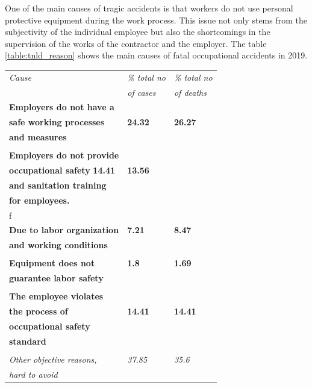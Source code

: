 \documentclass[conference]{IEEEtran}
\begin{document}
One of the main causes of tragic accidents is that workers do not use personal protective equipment during the work process. This issue not only stems from the subjectivity of the individual employee but also the shortcomings in the supervision of the works of the contractor and the employer. The table \ref{table:tnld_reason} shows the main causes of fatal occupational accidents in 2019.
\begin{center}

  \begin{tabular} {l l l}
  \toprule
  \it Cause & \it \% total no & \it \% total no \\
   & \it of cases & \it of deaths \\
  \midrule
  \textbf{Employers do not have a} \\ 
  \textbf{safe working processes} & \textbf{24.32} & \textbf{26.27} \\
  \textbf{and measures} \\
  \\
  \textbf{Employers do not provide} \\ 
  \textbf{occupational safety} \textbf{14.41} & \textbf{13.56} \\
  \textbf{and sanitation training} \\
  \textbf{for employees.} \\
f  \\
  \textbf{Due to labor organization} & \textbf{7.21} & \textbf{8.47} \\
  \textbf{and working conditions} \\
  \\
  \textbf{Equipment does not} & \textbf{1.8} & \textbf{1.69} \\
  \textbf{guarantee labor safety} \\
  \\
  \textbf{The employee violates} \\ 
  \textbf{the process of} & \textbf{14.41}  & \textbf{14.41} \\ 
  \textbf{occupational safety} \\
  \textbf{standard} \\
  \\
  \it {Other objective reasons,} & \it 37.85 & \it 35.6 \\
  \it {hard to avoid} \\
  \bottomrule
  \end{tabular}

\end{center}
\end{document}
